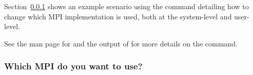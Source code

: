 Section~\ref{app:switcher-which-mpi-to-use} shows an example scenario
using the  command detailing how to change which MPI
implementation is used, both at the system-level and user-level.

See the man page for  and the output of  for more details on the  command.


\subsubsection{Which MPI do you want to use?}
\label{app:switcher-which-mpi-to-use}


